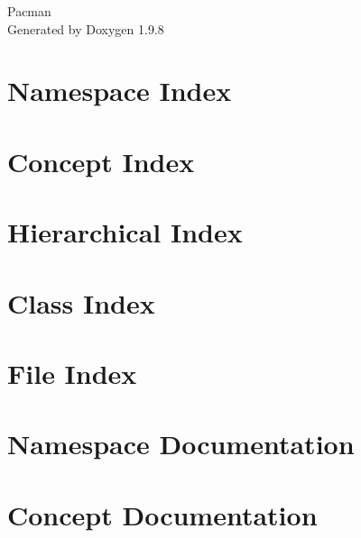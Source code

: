 \documentclass[twoside]{book}
\newcommand{\+}{\discretionary{\mbox{\scriptsize$\hookleftarrow$}}{}{}}
\newcommand{\clearemptydoublepage}{%
    \newpage{\pagestyle{empty}\cleardoublepage}%
  }
\begin{document}
  \raggedbottom
    \hypersetup{pageanchor=false,
                bookmarksnumbered=true,
                pdfencoding=unicode
               }
  \begin{titlepage}
  \vspace*{7cm}
  \begin{center}%
  {\Large Pacman}\\
  \vspace*{1cm}
  {\large Generated by Doxygen 1.9.8}\\
  \end{center}
  \end{titlepage}
  \clearemptydoublepage
  \tableofcontents
  \clearemptydoublepage
  \hypersetup{pageanchor=true}


\chapter{Namespace Index}

\chapter{Concept Index}

\chapter{Hierarchical Index}

\chapter{Class Index}

\chapter{File Index}

\chapter{Namespace Documentation}


\chapter{Concept Documentation}

\end{document}
